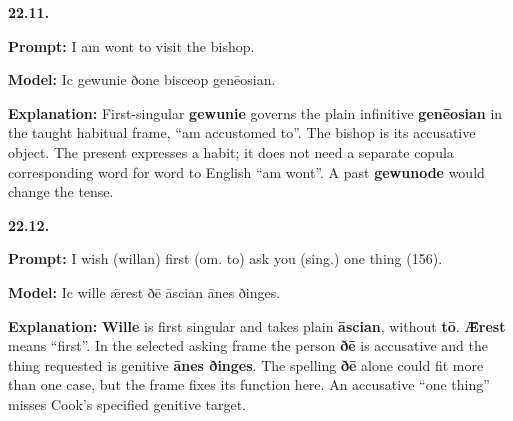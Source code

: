 \par\begin{minipage}{\linewidth}\raggedright
\textbf{22.11.}

\textbf{Prompt:} I am wont to visit the bishop.

\textbf{Model:} Ic gewunie ðone bisceop genēosian.

\textbf{Explanation:} First-singular \textbf{gewunie} governs the plain infinitive \textbf{genēosian} in the taught habitual frame, “am accustomed to”. The bishop is its accusative object. The present expresses a habit; it does not need a separate copula corresponding word for word to English “am wont”. A past \textbf{gewunode} would change the tense.

\end{minipage}\par\addvspace{4pt}

\par\begin{minipage}{\linewidth}\raggedright
\textbf{22.12.}

\textbf{Prompt:} I wish (willan) first (om. to) ask you (sing.) one thing (156).

\textbf{Model:} Ic wille ǣrest ðē āscian ānes ðinges.

\textbf{Explanation:} \textbf{Wille} is first singular and takes plain \textbf{āscian}, without \textbf{tō}. \textbf{Ǣrest} means “first”. In the selected asking frame the person \textbf{ðē} is accusative and the thing requested is genitive \textbf{ānes ðinges}. The spelling \textbf{ðē} alone could fit more than one case, but the frame fixes its function here. An accusative “one thing” misses Cook’s specified genitive target.

\end{minipage}\par\addvspace{4pt}

